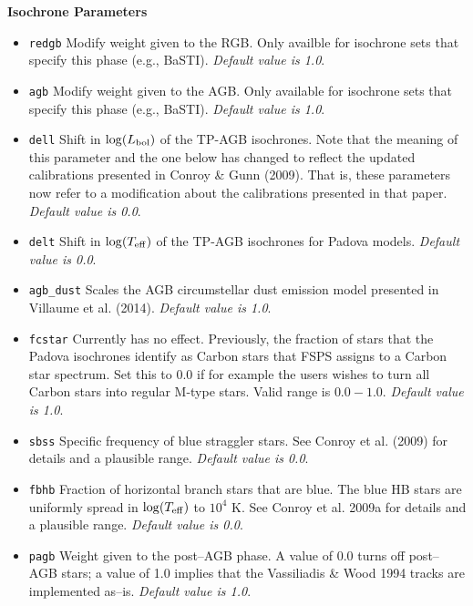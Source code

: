 \documentclass[]{article}
\begin{document}
\noindent
{\bf Isochrone Parameters}
\begin{itemize}
\item{\texttt{redgb}} Modify weight given to the RGB. Only availble for
  isochrone sets that specify this phase (e.g., BaSTI).
  {\it Default value is 1.0}.
\item{\texttt{agb}} Modify weight given to the AGB.  Only available for
  isochrone sets that specify this phase (e.g., BaSTI).
  {\it Default value is 1.0}.
\item{\texttt{dell}} Shift in ${\rm log}(L_{\rm bol})$ of the TP-AGB isochrones.
  Note that the meaning of this parameter and the one below has changed to
  reflect the updated calibrations presented in Conroy \& Gunn (2009).  That is,
  these parameters now refer to a modification about the calibrations presented
  in that paper.
  {\it Default value is 0.0}.
\item{\texttt{delt}} Shift in ${\rm log}(T_{\rm eff})$ of the TP-AGB isochrones
  for Padova models.
  {\it Default value is 0.0}.
\item{\texttt{agb\_dust}} Scales the AGB circumstellar dust emission model
  presented in Villaume et al. (2014).
  {\it Default value is 1.0}.
\item{\texttt{fcstar}} Currently has no effect.  Previously, the fraction of
  stars that the Padova isochrones identify as Carbon stars that FSPS assigns to
  a Carbon star spectrum.  Set this to 0.0 if for example the users wishes to
  turn all Carbon stars into regular M-type stars.  Valid range is $0.0-1.0$.
  {\it Default value is 1.0}.
\item{\texttt{sbss}} Specific frequency of blue straggler stars.  See Conroy et
  al. (2009) for details and a plausible range.
  {\it Default value is 0.0}.
\item{\texttt{fbhb}} Fraction of horizontal branch stars that are blue.  The
  blue HB stars are uniformly spread in ${\rm log}(T_{\rm eff})$ to $10^4$ K.
  See Conroy et al. 2009a for details and a plausible range.
  {\it Default value is 0.0}.
\item{\texttt{pagb}} Weight given to the post--AGB phase.  A value of 0.0 turns
  off post--AGB stars; a value of 1.0 implies that the Vassiliadis \& Wood 1994
  tracks are implemented as--is.
  {\it Default value is 1.0}.

\end{itemize}

\vspace{0.1in}
\vspace{0.1in}
\end{document}
